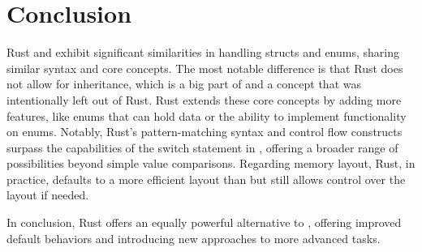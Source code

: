 \section{Conclusion}
Rust and \Cpp exhibit significant similarities in handling structs and enums, sharing similar syntax and core concepts.
The most notable difference is that Rust does not allow for inheritance, which is a big part of \Cpp and a concept that was intentionally left out of Rust.
Rust extends these core concepts by adding more features, like enums that can hold data or the ability to implement functionality on enums.
Notably, Rust's pattern-matching syntax and control flow constructs surpass the capabilities of the switch statement in \Cpp, offering a broader range of possibilities beyond simple value comparisons.
Regarding memory layout, Rust, in practice, defaults to a more efficient layout than \Cpp but still allows control over the layout if needed.

In conclusion, Rust offers an equally powerful alternative to \Cpp, offering improved default behaviors and introducing new approaches to more advanced tasks.

\enlargethispage{2\baselineskip}    %